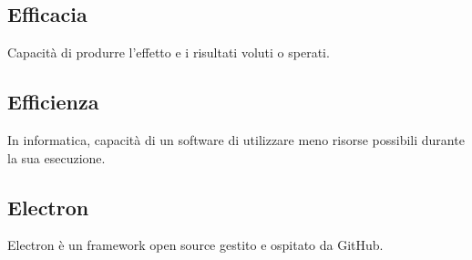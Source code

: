 
\subsection*{Efficacia}
Capacità di produrre l'effetto e i risultati voluti o sperati.

\subsection*{Efficienza}
In informatica, capacità di un software di utilizzare meno risorse possibili durante la sua esecuzione.

\subsection*{Electron}
Electron è un framework open source gestito e ospitato da GitHub.

